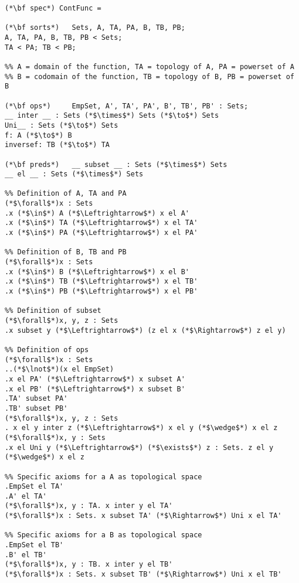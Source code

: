 \usepackage{enumerate}
\usepackage{amsmath}
\usepackage{lmodern}
\usepackage{listings}



\begin{lstlisting}
(*\bf spec*) ContFunc =

(*\bf sorts*)   Sets, A, TA, PA, B, TB, PB;
A, TA, PA, B, TB, PB < Sets;
TA < PA; TB < PB;

%% A = domain of the function, TA = topology of A, PA = powerset of A
%% B = codomain of the function, TB = topology of B, PB = powerset of B

(*\bf ops*)     EmpSet, A', TA', PA', B', TB', PB' : Sets;
__ inter __ : Sets (*$\times$*) Sets (*$\to$*) Sets
Uni__ : Sets (*$\to$*) Sets
f: A (*$\to$*) B
inversef: TB (*$\to$*) TA 

(*\bf preds*)   __ subset __ : Sets (*$\times$*) Sets
__ el __ : Sets (*$\times$*) Sets 

%% Definition of A, TA and PA
(*$\forall$*)x : Sets
.x (*$\in$*) A (*$\Leftrightarrow$*) x el A'
.x (*$\in$*) TA (*$\Leftrightarrow$*) x el TA'
.x (*$\in$*) PA (*$\Leftrightarrow$*) x el PA'

%% Definition of B, TB and PB
(*$\forall$*)x : Sets
.x (*$\in$*) B (*$\Leftrightarrow$*) x el B'
.x (*$\in$*) TB (*$\Leftrightarrow$*) x el TB'
.x (*$\in$*) PB (*$\Leftrightarrow$*) x el PB'

%% Definition of subset
(*$\forall$*)x, y, z : Sets
.x subset y (*$\Leftrightarrow$*) (z el x (*$\Rightarrow$*) z el y)

%% Definition of ops
(*$\forall$*)x : Sets
..(*$\lnot$*)(x el EmpSet)
.x el PA' (*$\Leftrightarrow$*) x subset A'  
.x el PB' (*$\Leftrightarrow$*) x subset B'  
.TA' subset PA'  
.TB' subset PB'  
(*$\forall$*)x, y, z : Sets
. x el y inter z (*$\Leftrightarrow$*) x el y (*$\wedge$*) x el z 
(*$\forall$*)x, y : Sets
.x el Uni y (*$\Leftrightarrow$*) (*$\exists$*) z : Sets. z el y (*$\wedge$*) x el z

%% Specific axioms for a A as topological space
.EmpSet el TA'
.A' el TA'
(*$\forall$*)x, y : TA. x inter y el TA'
(*$\forall$*)x : Sets. x subset TA' (*$\Rightarrow$*) Uni x el TA'

%% Specific axioms for a B as topological space
.EmpSet el TB'
.B' el TB'
(*$\forall$*)x, y : TB. x inter y el TB'
(*$\forall$*)x : Sets. x subset TB' (*$\Rightarrow$*) Uni x el TB'


\end{lstlisting}
